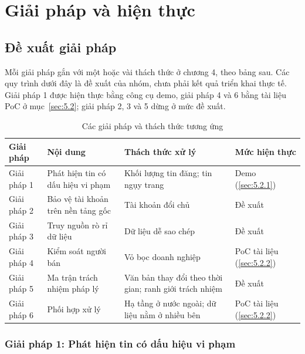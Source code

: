 \section{Giải pháp và hiện thực}\label{sec:5}

\subsection{Đề xuất giải pháp}\label{sec:5.1}

Mỗi giải pháp gắn với một hoặc vài thách thức ở chương 4, theo bảng sau. Các quy trình dưới đây là đề xuất của nhóm, chưa phải kết quả triển khai thực tế. Giải pháp 1 được hiện thực bằng công cụ demo, giải pháp 4 và 6 bằng tài liệu PoC ở mục~\ref{sec:5.2}; giải pháp 2, 3 và 5 dừng ở mức đề xuất.

{\small{}
\begin{table}[H]
\centering
\caption{Các giải pháp và thách thức tương ứng}\label{tab:5.6}
\begin{tabularx}{\textwidth}{>{\raggedright\arraybackslash}l>{\hsize=1.062\hsize\raggedright\arraybackslash}X>{\hsize=1.286\hsize\raggedright\arraybackslash}X>{\hsize=0.652\hsize\raggedright\arraybackslash}X}
\toprule
\textbf{Giải pháp} & \textbf{Nội dung} & \textbf{Thách thức xử lý} & \textbf{Mức hiện thực} \\
\midrule
Giải pháp 1 & Phát hiện tin có dấu hiệu vi phạm & Khối lượng tin đăng; tin ngụy trang & Demo (\ref{sec:5.2.1}) \\
Giải pháp 2 & Bảo vệ tài khoản trên nền tảng gốc & Tài khoản đổi chủ & Đề xuất \\
Giải pháp 3 & Truy nguồn rò rỉ dữ liệu & Dữ liệu dễ sao chép & Đề xuất \\
Giải pháp 4 & Kiểm soát người bán & Vỏ bọc doanh nghiệp & PoC tài liệu (\ref{sec:5.2.2}) \\
Giải pháp 5 & Ma trận trách nhiệm pháp lý & Văn bản thay đổi theo thời gian; ranh giới trách nhiệm & Đề xuất \\
Giải pháp 6 & Phối hợp xử lý & Hạ tầng ở nước ngoài; dữ liệu nằm ở nhiều bên & PoC tài liệu (\ref{sec:5.2.2}) \\
\bottomrule
\end{tabularx}
\end{table}}

\subsubsection{Giải pháp 1: Phát hiện tin có dấu hiệu vi phạm}\label{sec:5.1.1}

